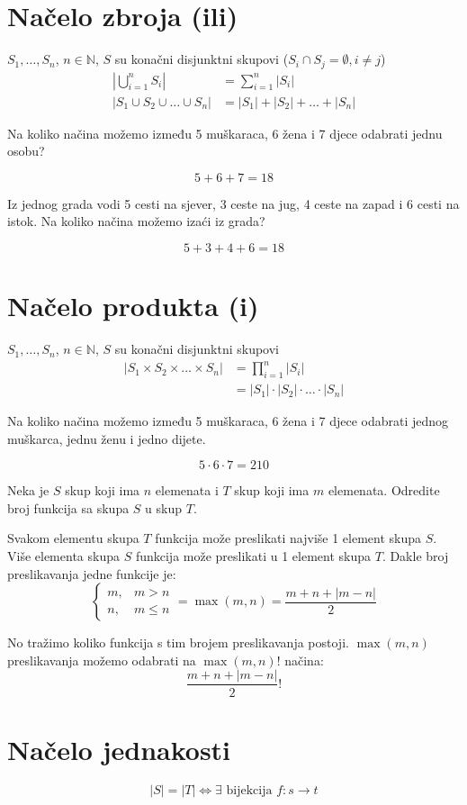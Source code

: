 \section{Načelo zbroja (ili)}
$S_1, \dots, S_n$, $n \in \mathbb{N}$, $S$ su konačni disjunktni skupovi ($S_i
\cap S_j = \emptyset, i\neq j$)
\begin{align}
    \left|\bigcup_{i=1}^nS_i\right| &= \sum_{i=1}^{n}|S_i| \\
    |S_1 \cup S_2 \cup \dots \cup S_n| &= |S_1| + |S_2| + \dots + |S_n|\nonumber
\end{align}

\begin{problem}
    Na koliko načina možemo između 5 muškaraca, 6 žena i 7 djece odabrati
    jednu osobu?
\end{problem}

$$
5+6+7 = 18
$$

\begin{problem}
    Iz jednog grada vodi 5 cesti na sjever, 3 ceste na jug, 4 ceste na
    zapad i 6 cesti na istok. Na koliko načina možemo izaći iz grada?
\end{problem}

$$
5+3+4+6 = 18
$$

\section{Načelo produkta (i)}
$S_1, \dots, S_n$, $n \in \mathbb{N}$, $S$ su konačni disjunktni skupovi
\begin{align}
    |S_1 \times S_2 \times \dots \times S_n| &= \prod_{i=1}^{n}|S_i| \\
    &= |S_1| \cdot |S_2| \cdot \ldots \cdot |S_n|\nonumber
\end{align}

\begin{problem}
    Na koliko načina možemo između 5 muškaraca, 6 žena i 7 djece odabrati jednog
    muškarca, jednu ženu i jedno dijete.
\end{problem}

$$
5\cdot 6\cdot 7 = 210
$$

\begin{problem}
    Neka je $S$ skup koji ima $n$ elemenata i $T$ skup koji ima $m$ elemenata.
    Odredite broj funkcija sa skupa $S$ u skup $T$.
\end{problem}

Svakom elementu skupa $T$ funkcija može preslikati najviše 1 element skupa $S$.
Više elementa skupa $S$ funkcija može preslikati u 1 element skupa $T$. Dakle
broj preslikavanja jedne funkcije je:
$$
\begin{cases*}
    m,&m>n\\
    n,&m\leq n
\end{cases*} = \max(m, n) = \frac{m+n+\left|m-n\right|}{2}
$$

No tražimo koliko funkcija s tim brojem preslikavanja postoji. $\max(m, n)$
preslikavanja možemo odabrati na $\max(m, n)!$ načina:
$$
\frac{m+n+\left|m-n\right|}{2}!
$$

\section{Načelo jednakosti}
$$
    |S| = |T| \iff \exists \text{ bijekcija } f: s \to t
$$
